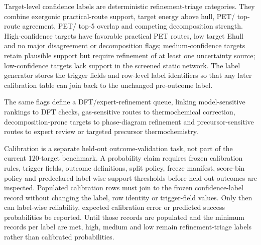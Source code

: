 \documentclass[11pt, letterpaper]{article}
\begin{document}
Target-level confidence labels are deterministic refinement-triage categories. They combine exergonic practical-route support, target energy above hull, PET/\mpform{} top-route agreement, PET/\mpform{} top-5 overlap and competing decomposition strength. High-confidence targets have favorable practical PET routes, low target Ehull and no major disagreement or decomposition flags; medium-confidence targets retain plausible support but require refinement of at least one uncertainty source; low-confidence targets lack support in the screened static network. The label generator stores the trigger fields and row-level label identifiers so that any later calibration table can join back to the unchanged pre-outcome label.

The same flags define a DFT/expert-refinement queue, linking model-sensitive rankings to DFT checks, gas-sensitive routes to thermochemical correction, decomposition-prone targets to phase-diagram refinement and precursor-sensitive routes to expert review or targeted precursor thermochemistry.

Calibration is a separate held-out outcome-validation task, not part of the current 120-target benchmark. A probability claim requires frozen calibration rules, trigger fields, outcome definitions, split policy, freeze manifest, score-bin policy and predeclared label-wise support thresholds before held-out outcomes are inspected. Populated calibration rows must join to the frozen confidence-label record without changing the label, row identity or trigger-field values. Only then can label-wise reliability, expected calibration error or predicted success probabilities be reported. Until those records are populated and the minimum records per label are met, high, medium and low remain refinement-triage labels rather than calibrated probabilities.
\end{document}
